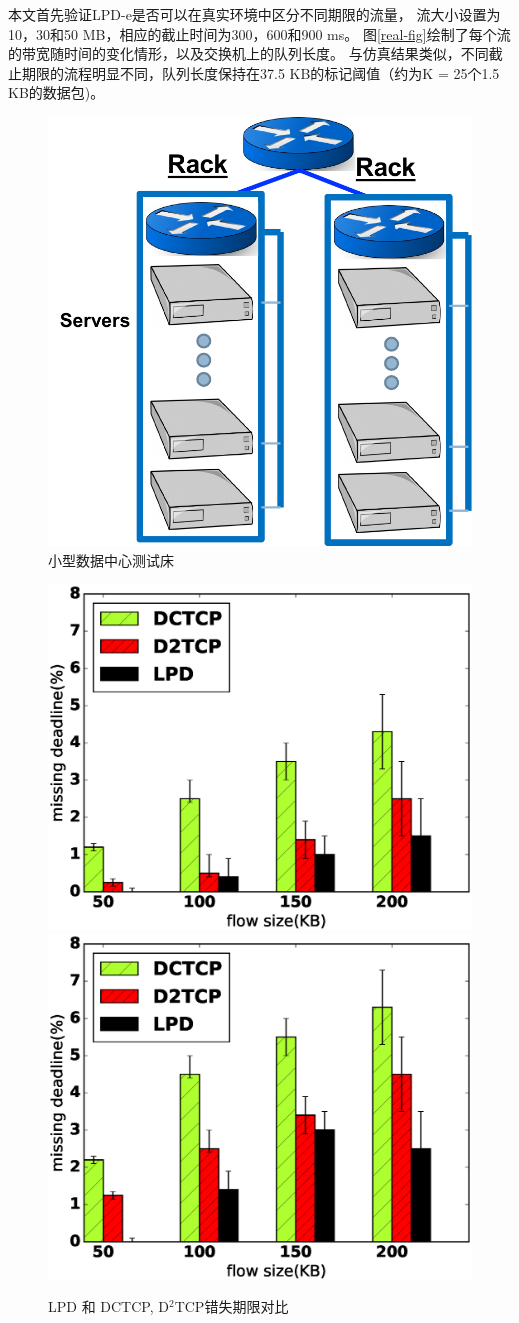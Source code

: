 本文首先验证LPD-e是否可以在真实环境中区分不同期限的流量，
流大小设置为10，30和50 MB，相应的截止时间为300，600和900 ms。
图\ref{real-fig}绘制了每个流的带宽随时间的变化情形，以及交换机上的队列长度。
与仿真结果类似，不同截止期限的流程明显不同，队列长度保持在37.5 KB的标记阈值（约为K = 25个1.5 KB的数据包)。

\begin{figure}[H] 
  \centering
  \includegraphics[width=0.7\columnwidth]{figures/LPD/realtopology.pdf}
  \caption{小型数据中心测试床}
\label{testbed-fig}
\end{figure}


\begin{figure}[h]
\centering
{}
 {\includegraphics[width=0.45\columnwidth]{figures/LPD/Realtest/miss_deadline_1.eps}}
{\includegraphics[width=0.45\columnwidth]{figures/LPD/Realtest/miss_deadline_2.eps}}
\caption{LPD 和 DCTCP, D$^2$TCP错失期限对比}
\label{testbed-deadlinemiss-fig}
\end{figure}




